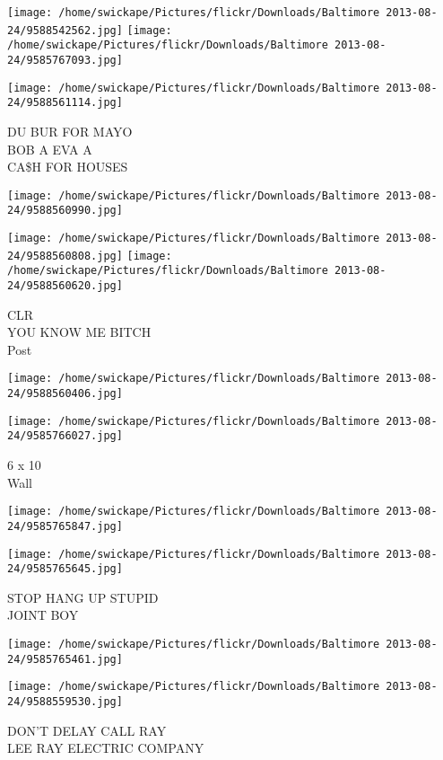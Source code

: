 \documentclass[10pt,letterpaper]{article}
\begin{document}
\texttt{[image: /home/swickape/Pictures/flickr/Downloads/Baltimore 2013-08-24/9588542562.jpg]}
\texttt{[image: /home/swickape/Pictures/flickr/Downloads/Baltimore 2013-08-24/9585767093.jpg]}

\texttt{[image: /home/swickape/Pictures/flickr/Downloads/Baltimore 2013-08-24/9588561114.jpg]}

DU BUR FOR MAYO\\
BOB A EVA A\\
CA\$H FOR HOUSES
\pagebreak

\texttt{[image: /home/swickape/Pictures/flickr/Downloads/Baltimore 2013-08-24/9588560990.jpg]}

\vspace{0.25in}
\texttt{[image: /home/swickape/Pictures/flickr/Downloads/Baltimore 2013-08-24/9588560808.jpg]}
\texttt{[image: /home/swickape/Pictures/flickr/Downloads/Baltimore 2013-08-24/9588560620.jpg]}

CLR\\
YOU KNOW ME BITCH\\
Post
\pagebreak

\texttt{[image: /home/swickape/Pictures/flickr/Downloads/Baltimore 2013-08-24/9588560406.jpg]}

\vspace{0.25in}
\texttt{[image: /home/swickape/Pictures/flickr/Downloads/Baltimore 2013-08-24/9585766027.jpg]}

6 x 10\\
Wall
\pagebreak

\texttt{[image: /home/swickape/Pictures/flickr/Downloads/Baltimore 2013-08-24/9585765847.jpg]}

\vspace{0.25in}
\texttt{[image: /home/swickape/Pictures/flickr/Downloads/Baltimore 2013-08-24/9585765645.jpg]}

STOP HANG UP STUPID\\
JOINT BOY
\pagebreak

\texttt{[image: /home/swickape/Pictures/flickr/Downloads/Baltimore 2013-08-24/9585765461.jpg]}

\vspace{0.25in}
\texttt{[image: /home/swickape/Pictures/flickr/Downloads/Baltimore 2013-08-24/9588559530.jpg]}

DON'T DELAY CALL RAY\\
LEE RAY ELECTRIC COMPANY
\pagebreak
\end{document}
